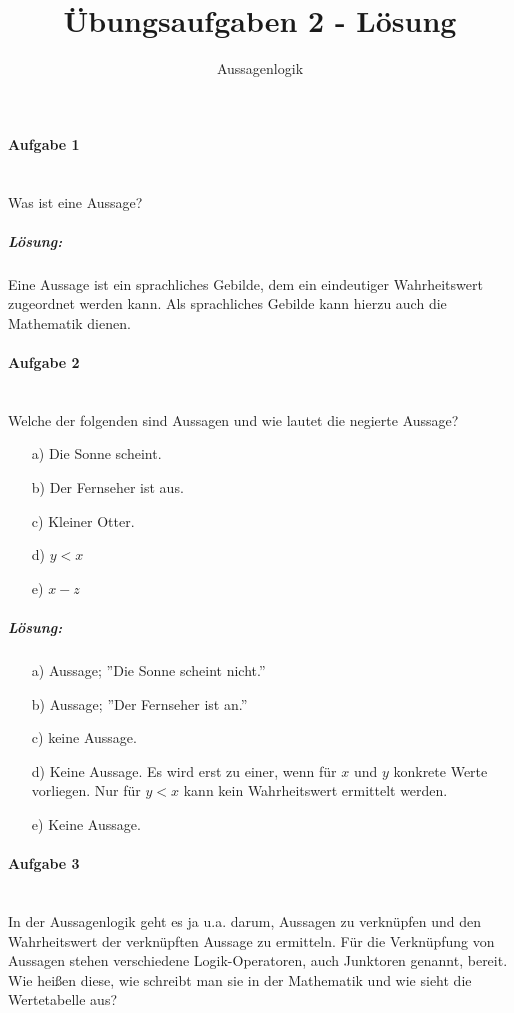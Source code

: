 \documentclass[12pt,a4paper,ngerman]{scrartcl}
\title{Übungsaufgaben 2 - Lösung}
\subtitle{Aussagenlogik}
\date{}
\begin{document}
	\maketitle
	
	\paragraph{Aufgabe 1}\mbox{}\\
	Was ist eine Aussage?
	
	\subparagraph{Lösung:} Eine Aussage ist ein sprachliches Gebilde, dem ein eindeutiger Wahrheitswert zugeordnet werden kann. Als sprachliches Gebilde kann hierzu auch die Mathematik dienen.
	
	\paragraph{Aufgabe 2}\mbox{}\\
	Welche der folgenden sind Aussagen und wie lautet die negierte Aussage?
	\begin{itemize}
		\item[a)] Die Sonne scheint.
		\item[b)] Der Fernseher ist aus.
		\item[c)] Kleiner Otter.
		\item[d)] $y < x$
		\item[e)] $x - z$
	\end{itemize}
	
	\subparagraph{Lösung: }
	\begin{itemize}
		\item[a)] Aussage; ''Die Sonne scheint nicht.''
		\item[b)] Aussage; ''Der Fernseher ist an.''
		\item[c)] keine Aussage.
		\item[d)] Keine Aussage. Es wird erst zu einer, wenn für $x$ und $y$ konkrete Werte vorliegen. Nur für $y < x$ kann kein Wahrheitswert ermittelt werden.
		\item[e)] Keine Aussage.
	\end{itemize}

	\paragraph{Aufgabe 3}\mbox{}\\	
	In der Aussagenlogik geht es ja u.a. darum, Aussagen zu verknüpfen und den Wahrheitswert der verknüpften Aussage zu ermitteln. Für die Verknüpfung von Aussagen stehen verschiedene Logik-Operatoren, auch Junktoren genannt, bereit. Wie heißen diese, wie schreibt man sie in der Mathematik und wie sieht die Wertetabelle aus?
	
\end{document}
